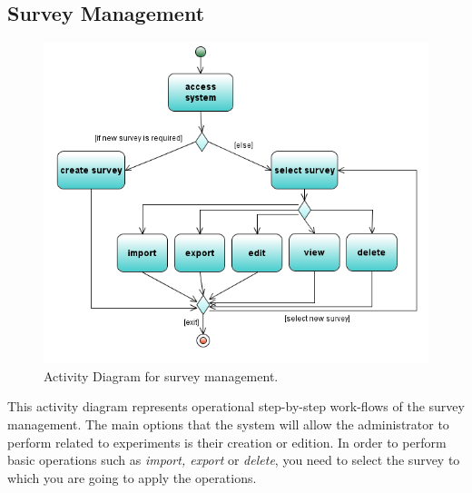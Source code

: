 \documentclass[a4paper,12pt,oneside]{report}
\begin{document}
\subsection{Survey Management}
\begin{figure}[!hp]
  \begin{center}
   \includegraphics[width=13.76cm]{pics/Activity2.png}
  \end{center}
\caption{Activity Diagram for survey management.}
\end{figure}
\vskip 1cm
This activity diagram represents operational step-by-step work-flows of the survey management. The main options that the system will allow the administrator to perform related to experiments is their creation or edition. In order to perform basic operations such as {\it import, export} or {\it delete}, you need to select the survey to which you are going to apply the operations.

\pagebreak
\pagebreak
\end{document}
